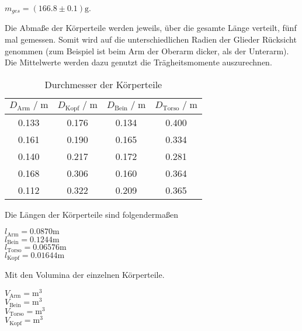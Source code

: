 \begin{center}
  $m_{ges} = (166.8\pm 0.1)\si{\gram}$.
\end{center}

Die Abmaße der Körperteile werden jeweils, über die gesamte Länge verteilt, fünf mal gemessen. Somit wird auf die unterschiedlichen
Radien der Glieder Rücksicht genommen (zum Beispiel ist beim Arm der Oberarm dicker, als der Unterarm). Die Mittelwerte werden dazu genutzt die
Trägheitsmomente auszurechnen.

\begin{table}
  \centering
    \caption{Durchmesser der Körperteile}
    \label{tab:durchmesser}
    \begin{tabular}{c c c c}
    \toprule
    $D_\text{Arm} \;/\; \si{\meter}$ & $D_\text{Kopf} \;/\; \si{\meter}$ & $D_\text{Bein} \;/\; \si{\meter}$ & $D_\text{Torso} \;/\; \si{\meter}$ \\
    \midrule
    0.133 & 0.176 & 0.134 & 0.400 \\
    0.161 & 0.190 & 0.165 & 0.334 \\
    0.140 & 0.217 & 0.172 & 0.281 \\
    0.168 & 0.306 & 0.160 & 0.364 \\
    0.112 & 0.322 & 0.209 & 0.365 \\
    \bottomrule
  \end{tabular}
\end{table}

Die Längen der Körperteile sind folgendermaßen %
\begin{center}
  $l_{\text{Arm}} = 0.0870 \si{\meter}$ \\
  $l_{\text{Bein}} = 0.1244 \si{\meter}$ \\
  $l_{\text{Torso}} = 0.06576 \si{\meter}$ \\
  $l_{\text{Kopf}} = 0.01644 \si{\meter}$ \\
\end{center}


Mit den Volumina der einzelnen Körperteile.
\begin{center}
  $V_{\text{Arm}} = \si{\meter^3}$ \\
  $V_{\text{Bein}} = \si{\meter^3}$ \\
  $V_{\text{Torso}} = \si{\meter^3}$ \\
  $V_{\text{Kopf}} = \si{\meter^3}$ \\
\end{center}

